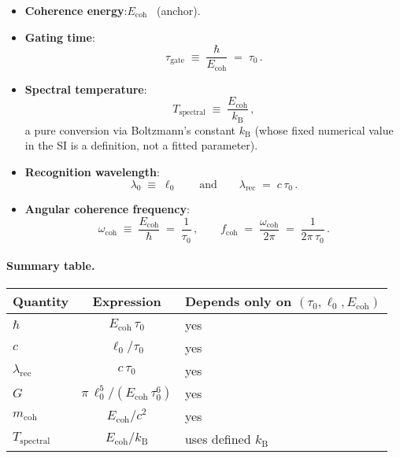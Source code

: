 \documentclass[12pt,a4paper]{article}
\theoremstyle{definition}
\theoremstyle{remark}
\begin{document}
\begin{itemize}
\item \textbf{Coherence energy}:\quad $E_{\mathrm{coh}}$ \ (anchor).

\item \textbf{Gating time}:\quad
\begin{equation}
\tau_{\mathrm{gate}} \;\equiv\; \frac{\hbar}{E_{\mathrm{coh}}} \;=\; \tau_0\,.
\end{equation}

\item \textbf{Spectral temperature}:\quad
\begin{equation}
T_{\mathrm{spectral}}
\;\equiv\;
\frac{E_{\mathrm{coh}}}{k_{\mathrm{B}}}\,,
\end{equation}
a pure conversion via Boltzmann's constant $k_{\mathrm{B}}$ (whose fixed numerical value in the SI is a definition, not a fitted parameter).

\item \textbf{Recognition wavelength}:\quad
\begin{equation}
\lambda_0 \;\equiv\; \ell_0 \qquad\text{and}\qquad
\lambda_{\mathrm{rec}} \;=\; c\,\tau_0\,.
\end{equation}

\item \textbf{Angular coherence frequency}:\quad
\begin{equation}
\omega_{\mathrm{coh}}
\;\equiv\;
\frac{E_{\mathrm{coh}}}{\hbar}
\;=\;
\frac{1}{\tau_0}\,,
\qquad
f_{\mathrm{coh}}
\;=\;
\frac{\omega_{\mathrm{coh}}}{2\pi}
\;=\;
\frac{1}{2\pi\,\tau_0}\,.
\end{equation}
\end{itemize}

\paragraph{Summary table.}
\begin{center}
\renewcommand{\arraystretch}{1.25}
\begin{tabular}{lcl}
\hline
Quantity & Expression & Depends only on \((\tau_0,\ell_0,E_{\mathrm{coh}})\) \\ \hline
\(\hbar\) & $E_{\mathrm{coh}}\,\tau_0$ & yes \\
\(c\) & \(\ell_0/\tau_0\) & yes \\
\(\lambda_{\mathrm{rec}}\) & \(c\,\tau_0\) & yes \\
\(G\) & \(\displaystyle \pi\,\ell_0^5/(E_{\mathrm{coh}}\,\tau_0^6)\) & yes \\
\(m_{\mathrm{coh}}\) & \(\displaystyle E_{\mathrm{coh}}/c^2\) & yes \\
\(T_{\mathrm{spectral}}\) & \(E_{\mathrm{coh}}/k_{\mathrm{B}}\) & uses defined \(k_{\mathrm{B}}\) \\ \hline
\end{tabular}
\end{center}
\end{document}
